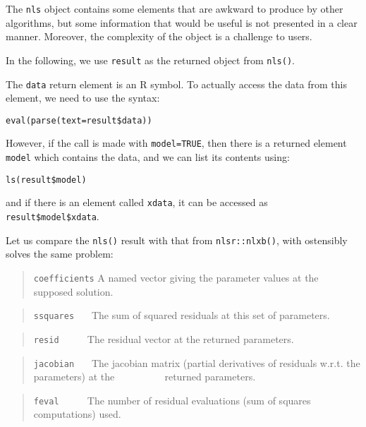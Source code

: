 \documentclass[
]{article}
\begin{document}
The \texttt{nls} object contains some elements that are awkward to
produce by other algorithms, but some information that would be useful
is not presented in a clear manner. Moreover, the complexity of the
object is a challenge to users.

In the following, we use \texttt{result} as the returned object from
\texttt{nls()}.

The \texttt{data} return element is an R symbol. To actually access the
data from this element, we need to use the syntax:

\begin{verbatim}
eval(parse(text=result$data))
\end{verbatim}

However, if the call is made with \texttt{model=TRUE}, then there is a
returned element \texttt{model} which contains the data, and we can list
its contents using:

\begin{verbatim}
ls(result$model)
\end{verbatim}

and if there is an element called \texttt{xdata}, it can be accessed as
\texttt{result\$model\$xdata}.

Let us compare the \texttt{nls()} result with that from
\texttt{nlsr::nlxb()}, with ostensibly solves the same problem:

\begin{quote}
\texttt{coefficients} A named vector giving the parameter values at the
supposed solution.
\end{quote}

\begin{quote}
\texttt{ssquares} \(~~~~~\) The sum of squared residuals at this set of
parameters.
\end{quote}

\begin{quote}
\texttt{resid} \(~~~~~~~~~~\) The residual vector at the returned
parameters.
\end{quote}

\begin{quote}
\texttt{jacobian} \(~~~~~\) The jacobian matrix (partial derivatives of
residuals w.r.t. the parameters) at the \newline
\(~~~~~~~~~~~~~~~~~~~~\) returned parameters.
\end{quote}

\begin{quote}
\texttt{feval} \(~~~~~~~~~~\) The number of residual evaluations (sum of
squares computations) used.
\end{quote}
\end{document}
